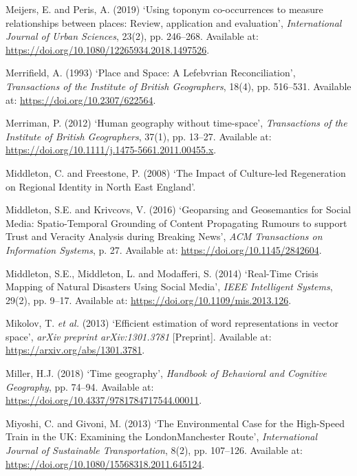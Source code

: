 \documentclass[
  letterpaper,
  11pt,
  english,
  onehalfspacing,
  headsepline]{MastersDoctoralThesis}
\newlength{\cslhangindent}
\newlength{\cslentryspacingunit} %
\newenvironment{CSLReferences}[2] %
 {%
  \setlength{\parindent}{0pt}
  \ifodd #1
  \let\oldpar\par
  \def\par{\hangindent=\cslhangindent\oldpar}
  \fi
  \setlength{\parskip}{#2\cslentryspacingunit}
 }%
 {}
\begin{document}
\begin{CSLReferences}{0}{0}
\leavevmode{}%
Meijers, E. and Peris, A. (2019) {`Using toponym co-occurrences to
measure relationships between places: Review, application and
evaluation'}, \emph{International Journal of Urban Sciences}, 23(2), pp.
246--268. Available at:
\url{https://doi.org/10.1080/12265934.2018.1497526}.

\leavevmode{}%
Merrifield, A. (1993) {`Place and {Space}: {A Lefebvrian
Reconciliation}'}, \emph{Transactions of the Institute of British
Geographers}, 18(4), pp. 516--531. Available at:
\url{https://doi.org/10.2307/622564}.

\leavevmode{}%
Merriman, P. (2012) {`Human geography without time-space'},
\emph{Transactions of the Institute of British Geographers}, 37(1), pp.
13--27. Available at:
\url{https://doi.org/10.1111/j.1475-5661.2011.00455.x}.

\leavevmode{}%
Middleton, C. and Freestone, P. (2008) {`The {Impact} of {Culture-led
Regeneration} on {Regional Identity} in {North East England}'}.

\leavevmode{}%
Middleton, S.E. and Krivcovs, V. (2016) {`Geoparsing and {Geosemantics}
for {Social Media}: {Spatio-Temporal Grounding} of {Content Propagating
Rumours} to support {Trust} and {Veracity Analysis} during {Breaking
News}'}, \emph{ACM Transactions on Information Systems}, p. 27.
Available at: \url{https://doi.org/10.1145/2842604}.

\leavevmode{}%
Middleton, S.E., Middleton, L. and Modafferi, S. (2014) {`Real-{Time
Crisis Mapping} of {Natural Disasters Using Social Media}'}, \emph{IEEE
Intelligent Systems}, 29(2), pp. 9--17. Available at:
\url{https://doi.org/10.1109/mis.2013.126}.

\leavevmode{}%
Mikolov, T. \emph{et al.} (2013) {`Efficient estimation of word
representations in vector space'}, \emph{arXiv preprint arXiv:1301.3781}
{[}Preprint{]}. Available at: \url{https://arxiv.org/abs/1301.3781}.

\leavevmode{}%
Miller, H.J. (2018) {`Time geography'}, \emph{Handbook of Behavioral and
Cognitive Geography}, pp. 74--94. Available at:
\url{https://doi.org/10.4337/9781784717544.00011}.

\leavevmode{}%
Miyoshi, C. and Givoni, M. (2013) {`The {Environmental Case} for the
{High-Speed Train} in the {UK}: {Examining} the
{London}{\textendash}{Manchester Route}'}, \emph{International Journal
of Sustainable Transportation}, 8(2), pp. 107--126. Available at:
\url{https://doi.org/10.1080/15568318.2011.645124}.


\end{CSLReferences}
\end{document}
